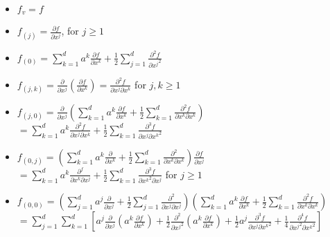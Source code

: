\documentclass[12pt]{article}
\begin{document}
\begin{itemize}
\item $f_v = f$
\item $f_{(j)} = \frac{\partial f}{\partial x^j}$, for $j \ge 1$
\item $f_{(0)} =  \sum_{k=1}^d a^k \frac{\partial f}{\partial x^k} + \frac{1}{2} \sum_{j=1}^d \frac{\partial^2 f}{\partial {x^j}^2}$
\item $f_{(j, k)} = \frac{\partial }{\partial x^j} \left( \frac{\partial f}{\partial x^k} \right) = \frac{\partial^2 f}{\partial x^j \partial x^k}$ for $j,k \ge 1$
\item $f_{(j,0)} = \frac{\partial }{\partial x^j} \left( \sum_{k=1}^d a^k \frac{\partial f}{\partial x^k} + \frac{1}{2} \sum_{k=1}^d \frac{\partial^2 f}{\partial x^k \partial x^k} \right)$ \\
$ =  \sum_{k=1}^d a^k \frac{\partial^2 f}{\partial x^j \partial x^k} + \frac{1}{2} \sum_{k=1}^d \frac{\partial^3 f}{\partial x^j \partial {x^k}^2}$ 
\item $f_{(0, j)} = \left( \sum_{k=1}^d a^k \frac{\partial}{\partial x^k} + \frac{1}{2} \sum_{k=1}^d  \frac{\partial^2}{\partial x^k \partial x^k} \right) \frac{\partial f}{\partial x^j}$ \\
$= \sum_{k=1}^d a^k \frac{\partial^ f}{\partial x^k \partial x^j} + \frac{1}{2} \sum_{k=1}^d  \frac{\partial^3 f}{\partial {x^k}^2 \partial x^j}$ for $j \ge 1$
\item $f_{(0,0)} = \left( \sum_{j=1}^d a^j \frac{\partial}{\partial x^j} + \frac{1}{2} \sum_{j=1}^d  \frac{\partial^2}{\partial x^j \partial x^j} \right) \left( \sum_{k=1}^d a^k \frac{\partial f}{\partial x^k} + \frac{1}{2} \sum_{k=1}^d \frac{\partial^2 f}{\partial x^k \partial x^k} \right)$ \\
$= \sum_{j=1}^d \sum_{k=1}^d \left[ a^j \frac{\partial}{\partial x^j}\left( a^k \frac{\partial f}{\partial x^k} \right) + \frac{1}{2} \frac{\partial^2}{\partial {x^j}^2} \left( a^k \frac{\partial f}{\partial x^k} \right) + \frac{1}{2} a^j \frac{\partial^3 f}{\partial x^j \partial {x^k}^2} + \frac{1}{4} \frac{\partial^4 f}{\partial {x^j}^2 \partial {x^k}^2} \right]$
\end{itemize}
\end{document}

